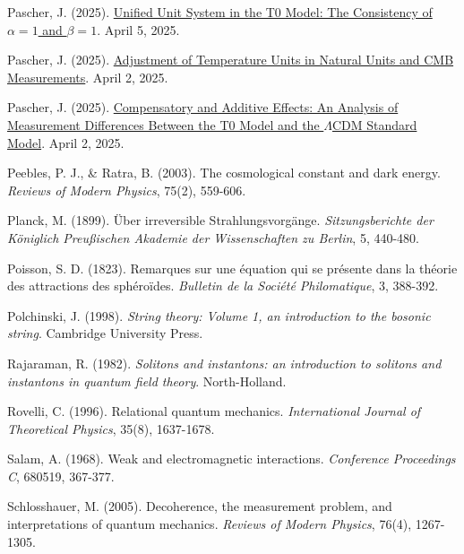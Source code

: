 \documentclass[a4paper,12pt]{article}
\begin{document}
\begin{thebibliography}{99}
		 Pascher, J. (2025). \href{https://github.com/jpascher/T0-Time-Mass-Duality/tree/main/2/pdf/English/Alpha1Beta1KonsistenzEn.pdf}{Unified Unit System in the T0 Model: The Consistency of \(\alpha = 1\) and \(\beta = 1\)}. April 5, 2025.
		
		 Pascher, J. (2025). \href{https://github.com/jpascher/T0-Time-Mass-Duality/tree/main/2/pdf/English/TempEinheitenCMBEn.pdf}{Adjustment of Temperature Units in Natural Units and CMB Measurements}. April 2, 2025.
		
		 Pascher, J. (2025). \href{https://github.com/jpascher/T0-Time-Mass-Duality/tree/main/2/pdf/English/MessdifferenzenT0StandardEn.pdf}{Compensatory and Additive Effects: An Analysis of Measurement Differences Between the T0 Model and the \(\Lambda\)CDM Standard Model}. April 2, 2025.
		
		 Peebles, P. J., \& Ratra, B. (2003). The cosmological constant and dark energy. \textit{Reviews of Modern Physics}, 75(2), 559-606.
		
		 Planck, M. (1899). Über irreversible Strahlungsvorgänge. \textit{Sitzungsberichte der Königlich Preußischen Akademie der Wissenschaften zu Berlin}, 5, 440-480.
		
		 Poisson, S. D. (1823). Remarques sur une équation qui se présente dans la théorie des attractions des sphéroïdes. \textit{Bulletin de la Société Philomatique}, 3, 388-392.
		
		 Polchinski, J. (1998). \textit{String theory: Volume 1, an introduction to the bosonic string}. Cambridge University Press.
		
		 Rajaraman, R. (1982). \textit{Solitons and instantons: an introduction to solitons and instantons in quantum field theory}. North-Holland.
		
		 Rovelli, C. (1996). Relational quantum mechanics. \textit{International Journal of Theoretical Physics}, 35(8), 1637-1678.
		
		 Salam, A. (1968). Weak and electromagnetic interactions. \textit{Conference Proceedings C}, 680519, 367-377.
		
		 Schlosshauer, M. (2005). Decoherence, the measurement problem, and interpretations of quantum mechanics. \textit{Reviews of Modern Physics}, 76(4), 1267-1305.
		

\end{thebibliography}
\end{document}
